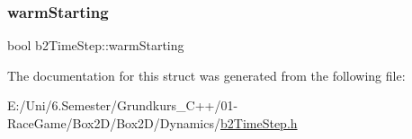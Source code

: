 \mbox{\label{structb2_time_step_add80f7f86c84f005ad817f0313df3f32}} 
\subsubsection{\texorpdfstring{warmStarting}{warmStarting}}
{\footnotesize\ttfamily bool b2\+Time\+Step\+::warm\+Starting}



The documentation for this struct was generated from the following file\+:\begin{DoxyCompactItemize}
\item 
E\+:/\+Uni/6.\+Semester/\+Grundkurs\+\_\+\+C++/01-\/\+Race\+Game/\+Box2\+D/\+Box2\+D/\+Dynamics/\mbox{\hyperlink{b2_time_step_8h}{b2\+Time\+Step.\+h}}\end{DoxyCompactItemize}

